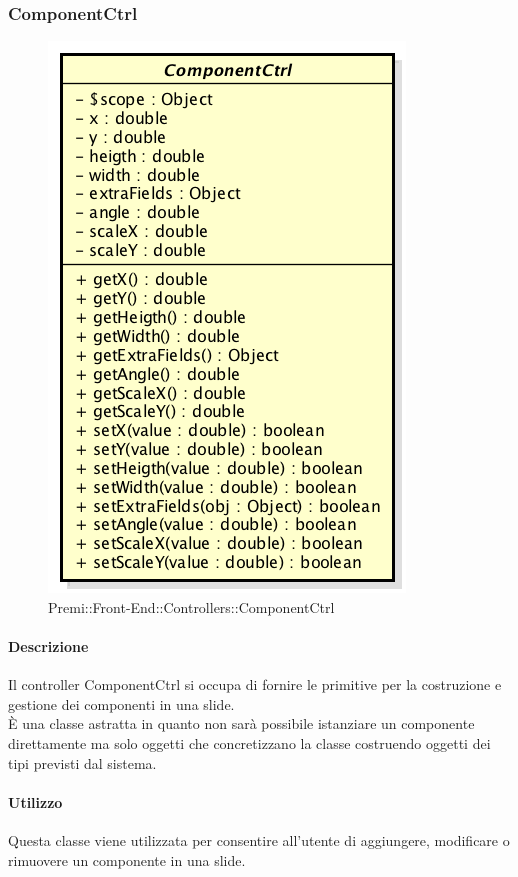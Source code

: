 \newpage
\subsubsection{ComponentCtrl}
	\begin{figure}[h]
		\centering
		\includegraphics[width=0.4\linewidth]{img/premi_front_end_controllers_componentctrl}
		\caption[Premi::Front-End::Controllers::ComponentCtrl]{Premi::Front-End::Controllers::ComponentCtrl}
	\end{figure}

    \paragraph{Descrizione}
	Il controller ComponentCtrl si occupa di fornire le primitive per la costruzione e gestione dei componenti in una slide.\\
	È una classe astratta in quanto non sarà possibile istanziare un componente direttamente ma solo oggetti che concretizzano la classe costruendo oggetti dei tipi previsti dal sistema.\\

	\paragraph{Utilizzo}
	Questa classe viene utilizzata per consentire all'utente di aggiungere, modificare o rimuovere un componente in una slide.

